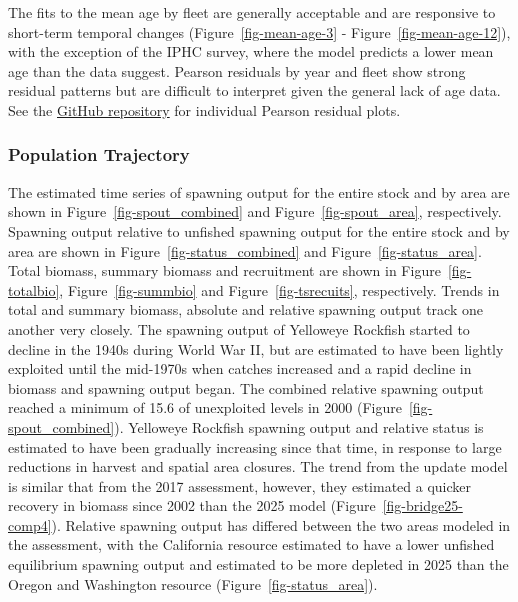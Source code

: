 \documentclass[
]{scrartcl}
\begin{document}
The fits to the mean age by fleet are generally acceptable and are
responsive to short-term temporal changes (Figure~\ref{fig-mean-age-3} -
Figure~\ref{fig-mean-age-12}), with the exception of the IPHC survey,
where the model predicts a lower mean age than the data suggest. Pearson
residuals by year and fleet show strong residual patterns but are
difficult to interpret given the general lack of age data. See the
\href{https://github.com/rclairer/Sebastes_ruberrimus_2025}{GitHub
repository} for individual Pearson residual plots.

\subsubsection{Population Trajectory}\label{population-trajectory}

The estimated time series of spawning output for the entire stock and by
area are shown in Figure~\ref{fig-spout_combined} and
Figure~\ref{fig-spout_area}, respectively. Spawning output relative to
unfished spawning output for the entire stock and by area are shown in
Figure~\ref{fig-status_combined} and Figure~\ref{fig-status_area}. Total
biomass, summary biomass and recruitment are shown in
Figure~\ref{fig-totalbio}, Figure~\ref{fig-summbio} and
Figure~\ref{fig-tsrecuits}, respectively. Trends in total and summary
biomass, absolute and relative spawning output track one another very
closely. The spawning output of Yelloweye Rockfish started to decline in
the 1940s during World War II, but are estimated to have been lightly
exploited until the mid-1970s when catches increased and a rapid decline
in biomass and spawning output began. The combined relative spawning
output reached a minimum of 15.6 of unexploited levels in 2000
(Figure~\ref{fig-spout_combined}). Yelloweye Rockfish spawning output
and relative status is estimated to have been gradually increasing since
that time, in response to large reductions in harvest and spatial area
closures. The trend from the update model is similar that from the 2017
assessment, however, they estimated a quicker recovery in biomass since
2002 than the 2025 model (Figure~\ref{fig-bridge25-comp4}). Relative
spawning output has differed between the two areas modeled in the
assessment, with the California resource estimated to have a lower
unfished equilibrium spawning output and estimated to be more depleted
in 2025 than the Oregon and Washington resource
(Figure~\ref{fig-status_area}).
\end{document}
